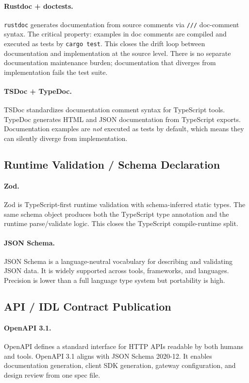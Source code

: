 \documentclass[11pt,a4paper]{article}
\theoremstyle{definition}
\begin{document}
\paragraph{Rustdoc + doctests.}
\texttt{rustdoc} generates documentation from source comments via \texttt{///} doc-comment syntax. The critical property: examples in doc comments are compiled and executed as tests by \texttt{cargo test}. This closes the drift loop between documentation and implementation at the source level. There is no separate documentation maintenance burden; documentation that diverges from implementation fails the test suite.

\paragraph{TSDoc + TypeDoc.}
TSDoc standardizes documentation comment syntax for TypeScript tools. TypeDoc generates HTML and JSON documentation from TypeScript exports. Documentation examples are \emph{not} executed as tests by default, which means they can silently diverge from implementation.

\subsection{Runtime Validation / Schema Declaration}

\paragraph{Zod.}
Zod is TypeScript-first runtime validation with schema-inferred static types. The same schema object produces both the TypeScript type annotation and the runtime parse/validate logic. This closes the TypeScript compile-runtime split.

\paragraph{JSON Schema.}
JSON Schema is a language-neutral vocabulary for describing and validating JSON data. It is widely supported across tools, frameworks, and languages. Precision is lower than a full language type system but portability is high.

\subsection{API / IDL Contract Publication}

\paragraph{OpenAPI 3.1.}
OpenAPI defines a standard interface for HTTP APIs readable by both humans and tools. OpenAPI 3.1 aligns with JSON Schema 2020-12. It enables documentation generation, client SDK generation, gateway configuration, and design review from one spec file.
\end{document}
